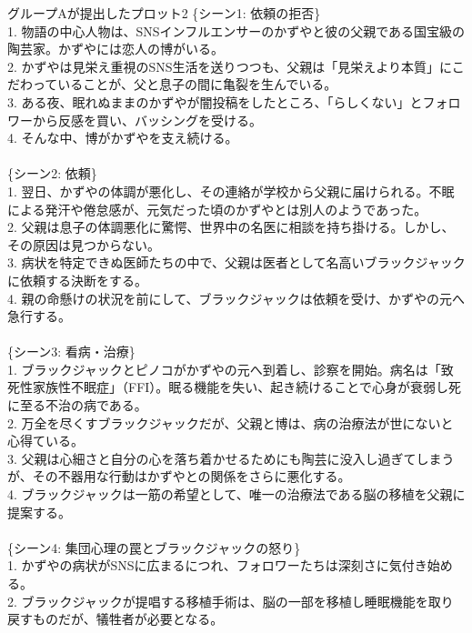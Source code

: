 \documentclass[a4j,12pt]{jsreport}
\begin{document}
\vspace{20pt}
\begin{breakitembox}
   [l]{グループAが提出したプロット2}
   \noindent\{シーン1: 依頼の拒否\}\\
   1. 物語の中心人物は、SNSインフルエンサーのかずやと彼の父親である国宝級の陶芸家。かずやには恋人の博がいる。\\
   2. かずやは見栄え重視のSNS生活を送りつつも、父親は「見栄えより本質」にこだわっていることが、父と息子の間に亀裂を生んでいる。\\
   3. ある夜、眠れぬままのかずやが闇投稿をしたところ、「らしくない」とフォロワーから反感を買い、バッシングを受ける。\\
   4. そんな中、博がかずやを支え続ける。\\
   \\
   \{シーン2: 依頼\}\\
   1. 翌日、かずやの体調が悪化し、その連絡が学校から父親に届けられる。不眠による発汗や倦怠感が、元気だった頃のかずやとは別人のようであった。\\
   2. 父親は息子の体調悪化に驚愕、世界中の名医に相談を持ち掛ける。しかし、その原因は見つからない。\\
   3. 病状を特定できぬ医師たちの中で、父親は医者として名高いブラックジャックに依頼する決断をする。\\
   4. 親の命懸けの状況を前にして、ブラックジャックは依頼を受け、かずやの元へ急行する。\\
   \\
   \{シーン3: 看病・治療\}\\
   1. ブラックジャックとピノコがかずやの元へ到着し、診察を開始。病名は「致死性家族性不眠症」（FFI）。眠る機能を失い、起き続けることで心身が衰弱し死に至る不治の病である。\\
   2. 万全を尽くすブラックジャックだが、父親と博は、病の治療法が世にないと心得ている。\\
   3. 父親は心細さと自分の心を落ち着かせるためにも陶芸に没入し過ぎてしまうが、その不器用な行動はかずやとの関係をさらに悪化する。\\
   4. ブラックジャックは一筋の希望として、唯一の治療法である脳の移植を父親に提案する。\\
   \\
   \{シーン4: 集団心理の罠とブラックジャックの怒り\}\\
   1. かずやの病状がSNSに広まるにつれ、フォロワーたちは深刻さに気付き始める。\\
   2. ブラックジャックが提唱する移植手術は、脳の一部を移植し睡眠機能を取り戻すものだが、犠牲者が必要となる。\\

\end{breakitembox}
\end{document}
